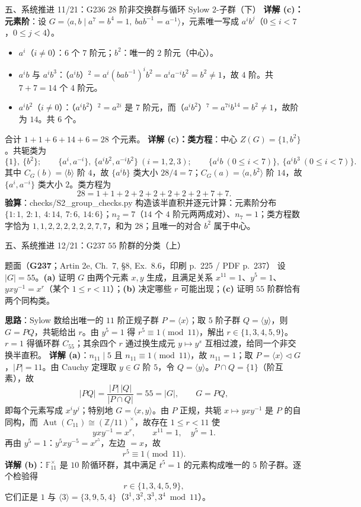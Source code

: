 \documentclass[aspectratio=169,10pt,fontset=none]{ctexbeamer}
\newcommand{\ex}[1]{\textcolor{accent}{\footnotesize\bfseries #1}}
\newcommand{\key}[1]{\textcolor{ink}{\bfseries #1}}
\begin{document}
\begin{frame}[t]{五、系统推进 11/21：G236 $28$ 阶非交换群与循环 Sylow $2$-子群（下）}
\scriptsize
\key{详解 (c)：元素阶}：设 $G=\langle a,b\mid a^7=b^4=1,\ bab^{-1}=a^{-1}\rangle$，元素唯一写成 $a^i b^j$（$0\le i<7$，$0\le j<4$）。
\begin{itemize}
\item $a^i$（$i\ne0$）：$6$ 个 $7$ 阶元；$b^2$：唯一的 $2$ 阶元（中心）。
\item $a^ib$ 与 $a^ib^3$：（$a^ib$）$^2=a^i(bab^{-1})^ib^2=a^ia^{-i}b^2=b^2\ne1$，故 $4$ 阶。共 $7+7=14$ 个 $4$ 阶元。
\item $a^ib^2$（$i\ne0$）：（$a^ib^2$）$^2=a^{2i}$ 是 $7$ 阶元，而（$a^ib^2$）$^7=a^{7i}b^{14}=b^2\ne1$，故阶为 $14$。共 $6$ 个。
\end{itemize}
合计 $1+1+6+14+6=28$ 个元素。
\key{详解 (c)：类方程}：中心 $Z(G)=\{1,b^2\}$。共轭类为
\[ \{1\},\ \{b^2\};\qquad
   \{a^i,a^{-i}\},\ \{a^ib^2,a^{-i}b^2\}\ (i=1,2,3);\qquad
   \{a^ib\ (0\le i<7)\},\ \{a^ib^3\ (0\le i<7)\}. \]
其中 $C_G(b)=\langle b\rangle$ 阶 $4$，故 $\{a^ib\}$ 类大小 $28/4=7$；$C_G(a)=\langle a,b^2\rangle$ 阶 $14$，故 $\{a^i,a^{-i}\}$ 类大小 $2$。类方程为
\[ 28=1+1+2+2+2+2+2+2+7+7. \]
\key{验算}：\textsf{checks/S2\_group\_checks.py} 构造该半直积并逐元计算：元素阶分布 $\{1:1,\ 2:1,\ 4:14,\ 7:6,\ 14:6\}$；$n_2=7$（$14$ 个 $4$ 阶元两两成对）、$n_7=1$；类方程数字恰为 $1,1,2,2,2,2,2,2,7,7$，和为 $28$；且唯一的对合 $b^2$ 属于中心。
\end{frame}

\begin{frame}[t]{五、系统推进 12/21：G237 $55$ 阶群的分类（上）}
\label{ex:G237}
\scriptsize
\begin{block}{\footnotesize 题面（\ex{G237}；Artin 2e, Ch.~7, §8, Ex.~8.6，印刷 p.~225 / PDF p.~237）}
设 $|G|=55$。\textbf{(a)} 证明 $G$ 由两个元素 $x,y$ 生成，且满足关系 $x^{11}=1$、$y^5=1$、$yxy^{-1}=x^r$（某个 $1\le r<11$）；\textbf{(b)} 决定哪些 $r$ 可能出现；\textbf{(c)} 证明 $55$ 阶群恰有两个同构类。
\end{block}
\key{思路}：Sylow 数给出唯一的 $11$ 阶正规子群 $P=\langle x\rangle$；取 $5$ 阶子群 $Q=\langle y\rangle$，则 $G=PQ$，共轭给出 $r$。由 $y^5=1$ 得 $r^5\equiv1\pmod{11}$，解出 $r\in\{1,3,4,5,9\}$。$r=1$ 得循环群 $C_{55}$；其余四个 $r$ 通过换生成元 $y\mapsto y^s$ 互相过渡，给同一个非交换半直积。
\key{详解 (a)}：$n_{11}\mid 5$ 且 $n_{11}\equiv1\pmod{11}$，故 $n_{11}=1$；取 $P=\langle x\rangle\triangleleft G$，$|P|=11$。由 Cauchy 定理取 $y\in G$ 阶 $5$，令 $Q=\langle y\rangle$。$P\cap Q=\{1\}$（阶互素），故
\[ |PQ|=\frac{|P|\,|Q|}{|P\cap Q|}=55=|G|,\qquad G=PQ, \]
即每个元素写成 $x^iy^j$；特别地 $G=\langle x,y\rangle$。由 $P$ 正规，共轭 $x\mapsto yxy^{-1}$ 是 $P$ 的自同构，而 $\operatorname{Aut}(C_{11})\cong(\mathbb Z/11)^\times$，故存在 $1\le r<11$ 使
\[ yxy^{-1}=x^r,\qquad x^{11}=1,\quad y^5=1. \]
再由 $y^5=1$：$y^5xy^{-5}=x^{r^5}$，左边 $=x$，故
\[ r^5\equiv1\pmod{11}. \]
\key{详解 (b)}：$\mathbb F_{11}^\times$ 是 $10$ 阶循环群，其中满足 $t^5=1$ 的元素构成唯一的 $5$ 阶子群。逐个检验得
\[ r\in\{1,3,4,5,9\}, \]
它们正是 $1$ 与 $\langle3\rangle=\{3,9,5,4\}$（$3^1,3^2,3^3,3^4\bmod 11$）。
\end{frame}
\end{document}
